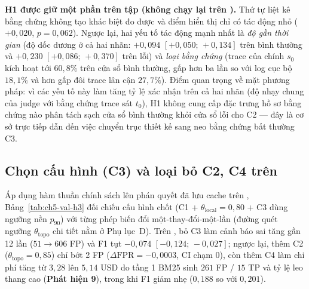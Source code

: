 \textbf{H1 được giữ một phần trên tập  (không chạy lại trên ).} Thứ tự liệt kê bằng chứng không tạo khác biệt đo được và điểm hiển thị chỉ có tác động nhỏ ($+0{,}020$, $p = 0{,}062$). Ngược lại, hai yếu tố tác động mạnh nhất là \emph{độ gần thời gian} (độ dốc dương ở cả hai nhãn: $+0{,}094$ $[+0{,}050;\, +0{,}134]$ trên bình thường và $+0{,}230$ $[+0{,}086;\, +0{,}370]$ trên lỗi) và \emph{loại bằng chứng} (trace của chính $s_0$ kích hoạt  tới $60{,}8\%$ trên cửa sổ bình thường, gấp hơn ba lần so với log cục bộ $18{,}1\%$ và hơn gấp đôi trace lân cận $27{,}7\%$). Điểm quan trọng về mặt phương pháp: vì các yếu tố này làm tăng tỷ lệ xác nhận trên cả hai nhãn (độ nhạy chung của judge với bằng chứng trace sát $t_0$), H1 không cung cấp đặc trưng hồ sơ bằng chứng nào phân tách sạch cửa sổ bình thường khỏi cửa sổ lỗi cho C2 — đây là cơ sở trực tiếp dẫn đến việc chuyển trục thiết kế sang neo bằng chứng bất thường C3.

\subsection{Chọn cấu hình \CTAV{} (C3) và loại bỏ C2, C4 trên }
\label{sec:ch5-val-ctav}

Áp dụng hàm thuần chính sách lên phán quyết đã lưu cache trên , Bảng~\ref{tab:ch5-val-h3} đối chiếu cấu hình \CTAV{} chốt (C1 + $\theta_{\text{local}} = 0{,}80$ + C3 dùng ngưỡng nền  $p_{90}$) với từng phép biến đổi một-thay-đổi-một-lần (đường quét ngưỡng $\theta_{\text{topo}}$ chi tiết nằm ở Phụ lục~D). Trên , bỏ C3 làm cảnh báo sai tăng gần 12 lần ($51 \to 606$ FP) và F1 tụt $-0{,}074$ $[-0{,}124;\, -0{,}027]$; ngược lại, thêm C2 ($\theta_{\text{topo}} = 0{,}85$) chỉ bớt 2 FP ($\Delta\text{FPR} = -0{,}0003$, CI chạm $0$), còn thêm C4 làm chi phí tăng từ $3{,}28$ lên $5{,}14$ USD do tầng 1 BM25 sinh $261$ FP / $15$ TP và tỷ lệ leo thang cao (\textbf{Phát hiện 9}), trong khi F1 giảm nhẹ ($0{,}188$ so với $0{,}201$).


